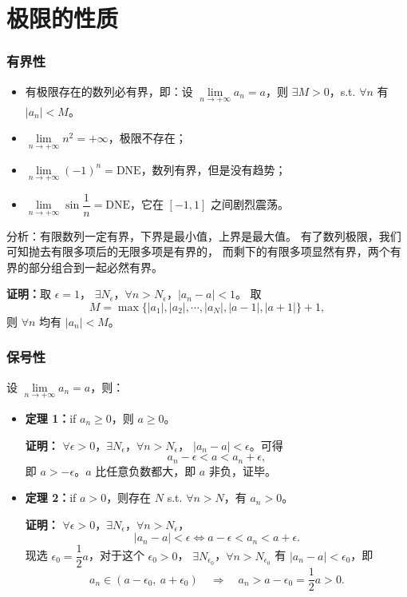 \documentclass[UTF8,11pt]{ctexart}
\theoremstyle{cnthm}
\begin{document}
\section{极限的性质}

\subsubsection*{有界性}

\begin{itemize}
\item 有极限存在的数列必有界，即：设
$\lim\limits_{n\to+\infty}a_n=a$，则 $\exists M>0$，s.t.
$\forall n$ 有 $|a_n|<M$。
\item $\lim\limits_{n\to+\infty}n^2=+\infty$，极限不存在；
\item $\lim\limits_{n\to+\infty}(-1)^n=\mathrm{DNE}$，数列有界，但是没有趋势；
\item $\lim\limits_{n\to+\infty}\sin\dfrac1n=\mathrm{DNE}$，它在 $[-1,1]$
之间剧烈震荡。
\end{itemize}

分析：有限数列一定有界，下界是最小值，上界是最大值。
有了数列极限，我们可知抛去有限多项后的无限多项是有界的，
而剩下的有限多项显然有界，两个有界的部分组合到一起必然有界。

\textbf{证明：}\quad 取 $\epsilon=1$，
$\exists N_\epsilon$，$\forall n>N_\epsilon$，$|a_n-a|<1$。
取
\[
M=\max\{|a_1|,|a_2|,\cdots,|a_N|,|a-1|,|a+1|\}+1,
\]
则 $\forall n$ 均有 $|a_n|<M$。

\subsubsection*{保号性}

设 $\lim\limits_{n\to+\infty}a_n=a$，则：

\begin{itemize}
\item \textbf{定理 1：}\quad if $a_n\geq0$，则 $a\geq0$。

\textbf{证明：}\quad
$\forall\epsilon>0$，$\exists N_\epsilon$，$\forall n>N_\epsilon$，
$|a_n-a|<\epsilon$。可得
\[
a_n-\epsilon<a<a_n+\epsilon,
\]
即 $a>-\epsilon$。$a$ 比任意负数都大，即 $a$ 非负，证毕。

\item \textbf{定理 2：}\quad if $a>0$，则存在 $N$ s.t.
$\forall n>N$，有 $a_n>0$。

\textbf{证明：}\quad
$\forall\epsilon>0$，$\exists N_\epsilon$，$\forall n>N_\epsilon$，
\[
|a_n-a|<\epsilon\iff a-\epsilon<a_n<a+\epsilon .
\]
现选 $\epsilon_0=\dfrac12a$，对于这个 $\epsilon_0>0$，
$\exists N_{\epsilon_0}$，$\forall n>N_{\epsilon_0}$ 有
$|a_n-a|<\epsilon_0$，即
\[
a_n\in(a-\epsilon_0,\ a+\epsilon_0)
\quad\Longrightarrow\quad
a_n>a-\epsilon_0=\frac12a>0 .
\]
\end{itemize}
\end{document}

